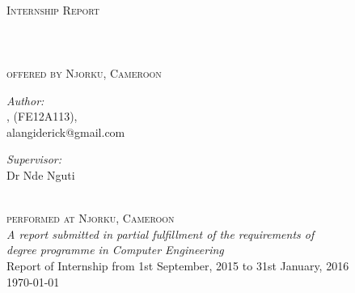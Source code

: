 \documentclass[
11pt, %
english, %
singlespacing, %
headsepline, %
]{InternshipReport} %
\author{Alangi \textsc{Derick}} %
\begin{document}
\frontmatter %

\pagestyle{plain} %


\begin{titlepage}
\begin{center}

\textsc{\LARGE \univname}\\[1.5cm] %
\textsc{\Large Internship Report}\\[0.5cm] %

\HRule \\[0.4cm] %
{\huge \bfseries \ttitle}\\[0.4cm] %
\HRule \\[1cm] %

\textsc{\Large offered by \LARGE Njorku, Cameroon}\\[1.2cm] %
 

\begin{minipage}{0.4\textwidth}
\begin{flushleft} \large
\emph{Author:}\\
{\authorname, (FE12A113), \\ alangiderick@gmail.com} %
\end{flushleft}
\end{minipage}
\begin{minipage}{0.4\textwidth}
\begin{flushright} \large
\emph{Supervisor:} \\
{Dr Nde Nguti} %
\end{flushright}
\end{minipage}\\[1.8cm]

\textsc{\Large performed at \LARGE Njorku, Cameroon}\\[2.0cm] %
 
\large \textit{A report submitted in partial fulfillment of the requirements of \\ \degreename degree programme in Computer Engineering} \\[1.2cm] %

\large{Report of Internship from 1st September, 2015 to 31st January, 2016}\\[2cm]
 
{\large \today}\\[4cm] %
 
\vfill
\end{center}
\end{titlepage}
\end{document}
